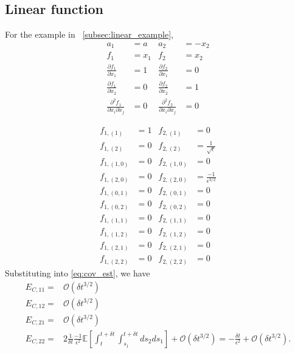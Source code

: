 \subsection{Linear function}

For the example in \sec~\ref{subsec:linear_example},
\begin{equation}
\begin{aligned}
a_1 &= a
&
a_2 &= -x_2
\\
f_1 &= x_1
&
f_2 &= x_2
\\
\frac{\partial f_1}{\partial x_1} &= 1
&
\frac{\partial f_2}{\partial x_1} &= 0
\\
\frac{\partial f_1}{\partial x_2} &= 0
&
\frac{\partial f_2}{\partial x_2} &= 1
\\
\frac{\partial^2 f_1}{\partial x_i \partial x_j} &= 0
&
\frac{\partial^2 f_2}{\partial x_i \partial x_j} &= 0
\end{aligned}
\end{equation}

\begin{equation}
\begin{aligned}
f_{1,(1)} &= 1
&
f_{2,(1)} &= 0
\\
f_{1,(2)} &= 0
&
f_{2,(2)} &= \frac{1}{\sqrt{\epsilon}}
\\
f_{1,(1,0)} &= 0
&
f_{2,(1,0)} &= 0
\\
f_{1,(2,0)} &= 0
&
f_{2,(2,0)} &= \frac{-1}{\epsilon^{3/2}}
\\
f_{1,(0,1)} &= 0
&
f_{2,(0,1)} &= 0
\\
f_{1,(0,2)} &= 0
&
f_{2,(0,2)} &= 0
\\
f_{1,(1,1)} &= 0
&
f_{2,(1,1)} &= 0
\\
f_{1,(1,2)} &= 0
&
f_{2,(1,2)} &= 0
\\
f_{1,(2,1)} &= 0
&
f_{2,(2,1)} &= 0
\\
f_{1,(2,2)} &= 0
&
f_{2,(2,2)} &= 0
\end{aligned}
\end{equation}
%
Substituting into \eqref{eq:cov_est}, we have
\begin{equation}
\begin{aligned}
E_{C, 11} =& \mathcal{O} (\delta t^{3/2}) \\
E_{C,12} =& \mathcal{O} (\delta t^{3/2}) \\
E_{C,21} =& \mathcal{O} (\delta t^{3/2}) \\
E_{C,22} =&
2 \frac{1}{\delta t}\frac{-1}{\epsilon^2} \mathbb{E} \left[ \int_t^{t+\delta t} \int_{s_1}^{t+\delta t} ds_2 ds_1 \right] + \mathcal{O} (\delta t^{3/2})
= - \frac{\delta t}{\epsilon^2} + \mathcal{O} (\delta t^{3/2}) .
\end{aligned}
\end{equation}


